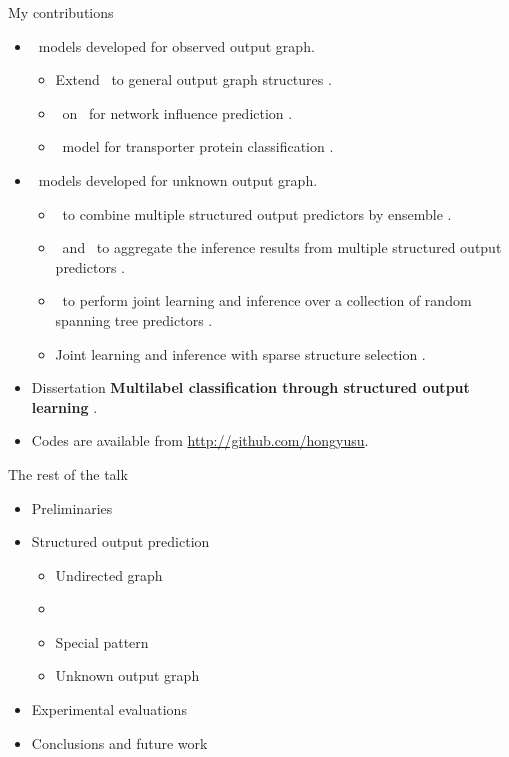 \documentclass[first=dgreen,second=purple,logo=red]{aaltoslides}
\begin{document}
%
\begin{frame}{My contributions}
	\begin{itemize}\footnotesize
		\item \sop\ models developed for observed output graph.
		\begin{itemize}\footnotesize
			\item Extend \mmcrf\ to general output graph structures \cite{su10structured}.
			\item \spin\ on \daggraph\ for network influence prediction \cite{su14structured}.
			\item \sop\ model for transporter protein classification \cite{su2015transporter}.
		\end{itemize}
		\item \sop\ models developed for unknown output graph.
		\begin{itemize}\footnotesize
			\item \mve\ to combine multiple structured output predictors by ensemble \cite{su11mutitask}.
			\item \amm\ and \mam\ to aggregate the inference results from multiple structured output predictors \cite{su2013multilabelacml,su15multilabel}.
			\item \rta\ to perform joint learning and inference over a collection of random spanning tree predictors \cite{su14multilabelnips}.
			\item Joint learning and inference with sparse structure selection \cite{Cousins2015large,Cousins2015mutiple}.
		\end{itemize}
		\item Dissertation {\bf Multilabel classification through structured output learning} \cite{Su2014Multilabel}.
		\item Codes are available from \href{https://github.com/hongyusu?tab=repositories}{http://github.com/hongyusu}.
	\end{itemize}
\end{frame}


%
\begin{frame}{The rest of the talk}
	\begin{itemize}\footnotesize
		\item Preliminaries
		\item Structured output prediction
		\begin{itemize}\footnotesize
			\item Undirected graph
			\item \daggraph
			\item Special pattern
			\item Unknown output graph
		\end{itemize}
		\item Experimental evaluations
		\item Conclusions and future work
	\end{itemize}
\end{frame}
\end{document}

